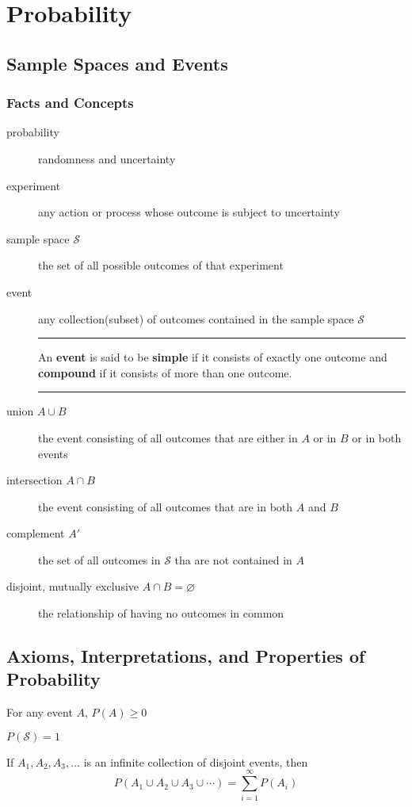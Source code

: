 \chapter{Probability}

\section{Sample Spaces and Events}

\subsection{Facts and Concepts}

\begin{description}
	\item[probability] randomness and uncertainty
	\item[experiment] any action or process whose outcome is subject to uncertainty
	\item[sample space $\mathcal{S}$] the set of all possible outcomes of that experiment
	\item[event] any collection(subset) of outcomes contained in the sample space $\mathcal{S}$\\
	\rule{\linewidth}{1pt}
	\par An \textbf{event} is said to be \textbf{simple} if it consists of exactly one outcome and \textbf{compound} if it consists of more than one outcome.\\
	\rule{\linewidth}{1pt}
	\item[union $A\cup B$] the event consisting of all outcomes that are either in $A$ or in $B$ or in both events
	\item[intersection $A\cap B$] the event consisting of all outcomes that are in both $A$ and $B$
	\item[complement $A'$] the set of all outcomes in $\mathcal{S}$ tha are not contained in $A$
	\item[disjoint, mutually exclusive $A\cap B = \varnothing$] the relationship of having no outcomes in common
\end{description}

\section{Axioms, Interpretations, and Properties of Probability}


\begin{axiom}
	For any event $A$, $P(A)\geq 0$
\end{axiom}
\begin{axiom}
	$P(\mathcal{S})=1$
\end{axiom}
\begin{axiom}
	If $A_1, A_2, A_3, \dots$ is an infinite collection of disjoint events, then
	$$ P(A_1\cup A_2 \cup A_3 \cup \cdots) = \sum\limits_{i = 1} ^ {\infty}P(A_i)$$
\end{axiom}

